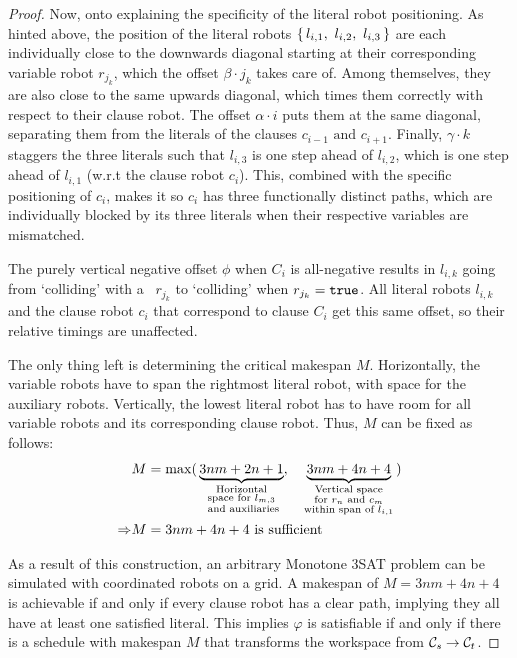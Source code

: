 \begin{proof}
	Now, onto explaining the specificity of the literal robot positioning. 
	As hinted above, the position of the literal robots \(\set{l_{i,1},\ l_{i,2},\ l_{i,3}}\) are each individually close to the downwards diagonal starting at their corresponding variable robot \(r_{j_k}\), which the offset \(\beta \cdot j_k\) takes care of. 
	Among themselves, they are also close to the same upwards diagonal, which times them correctly with respect to their clause robot. 
	The offset \(\alpha \cdot i\) puts them at the same diagonal, separating them from the literals of the clauses \(c_{i-1} \text{ and } c_{i+1}\). 
	Finally, \(\gamma \cdot k\) staggers the three literals such that \(l_{i,3}\) is one step ahead of \(l_{i,2}\), which is one step ahead of \(l_{i,1}\) (w.r.t the clause robot \(c_i\)). 
	This, combined with the specific positioning of \(c_i\), makes it so \(c_i\) has three functionally distinct paths, which are individually blocked by its three literals when their respective variables are mismatched.

	The purely vertical negative offset \(\phi\) when \(C_i\) is all-negative results in \(l_{i,k}\) going from `colliding' with a \false\ \(r_{j_k}\) to `colliding' when \(r_{j_k} = \texttt{true}\). 
	All literal robots \(l_{i,k}\) and the clause robot \(c_i\) that correspond to clause \(C_i\) get this same offset, so their relative timings are unaffected.
	
	The only thing left is determining the critical makespan \(M\).
	Horizontally, the variable robots have to span the rightmost literal robot, with space for the auxiliary robots.
	Vertically, the lowest literal robot has to have room for all variable robots and its corresponding clause robot.
	Thus, \(M\) can be fixed as follows:
	\begin{align*}
		& M = \max (\, 
			\underbrace{3nm + 2n + 1}_{
				\substack{
					\text{Horizontal} \\
					\text{space for \(l_{m,3}\)} \\
					\text{ and auxiliaries}
				}
			}, \quad
			\underbrace{3nm + 4n + 4}_{
				\substack{
					\text{Vertical space} \\
					\text{for \(r_n\) and \(c_m\)} \\
					\text{within span of \(l_{i,1}\)}
				}
			}
		 \,) \\
		\Rightarrow & M = 3nm + 4n + 4 \ \text{is sufficient}
	\end{align*}

	As a result of this construction, an arbitrary Monotone 3SAT problem can be simulated with coordinated robots on a grid. 
	A makespan of \(M = 3nm + 4n + 4\) is achievable if and only if every clause robot has a clear path, implying they all have at least one satisfied literal. 
	This implies \(\varphi\) is satisfiable if and only if there is a schedule with makespan \(M\) that transforms the workspace from \(\mathcal{C}_{s} \rightarrow \mathcal{C}_{t}\).
\end{proof}


